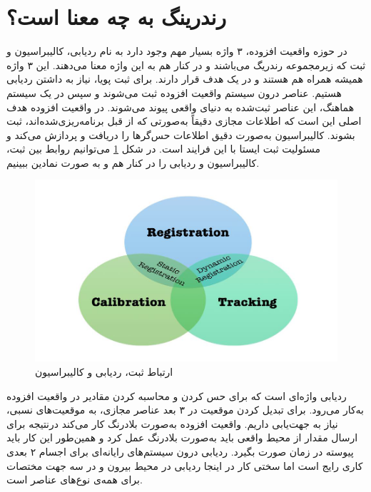 \section{رندرینگ به چه معنا است؟}
در حوزه واقعیت افزوده، ۳ واژه بسیار مهم وجود دارد به نام ردیابی، کالیبراسیون و ثبت که زیرمجموعه رندریگ می‌باشند و در کنار هم به این واژه معنا می‌دهند. این ۳ واژه همیشه همراه هم هستند و در یک هدف قرار دارند. برای ثبت پویا، نیاز به داشتن ردیابی هستیم. عناصر درون سیستم واقعیت افزوده ثبت می‌شوند و سپس در یک سیستم هماهنگ، این عناصر ثبت‌شده به دنیای واقعی پیوند می‌شوند. در واقعیت افزوده هدف اصلی این است که اطلاعات مجازی دقیقاً به‌صورتی که از قبل برنامه‌ریزی‌شده‌اند، ثبت بشوند. کالیبراسیون به‌صورت دقیق اطلاعات حس‌گرها را دریافت و پردازش می‌کند و مسئولیت ثبت ایستا با این فرایند است\cite{siltanen2012theory}. در شکل \ref{fig:rct} می‌توانیم روابط بین ثبت، کالیبراسیون و ردیابی را در کنار هم و به صورت نمادین ببینیم.


\begin{figure}
	\centering
	\includegraphics[width=1\linewidth]{image/rct}
	\caption {ارتباط ثبت، ردیابی و کالیبراسیون\cite{siltanen2012theory}}
	\label{fig:rct}
\end{figure}

ردیابی واژه‌ای است که برای حس کردن و محاسبه کردن مقادیر در واقعیت افزوده به‌کار می‌رود. برای تبدیل کردن موقعیت در ۳ بعد عناصر مجازی، به موقعیت‌های نسبی، نیاز به جهت‌یابی داریم. واقعیت افزوده به‌صورت بلادرنگ کار می‌کند درنتیجه برای ارسال مقدار از محیط واقعی باید به‌صورت بلادرنگ عمل کرد و همین‌طور این کار باید پیوسته در زمان صورت بگیرد. ردیابی درون سیستم‌های رایانه‌ای برای اجسام ۲ بعدی کاری رایج است اما سختی کار در اینجا ردیابی در محیط بیرون و در سه جهت مختصات برای همه‌ی نوع‌های عناصر است\cite{siltanen2012theory}.

